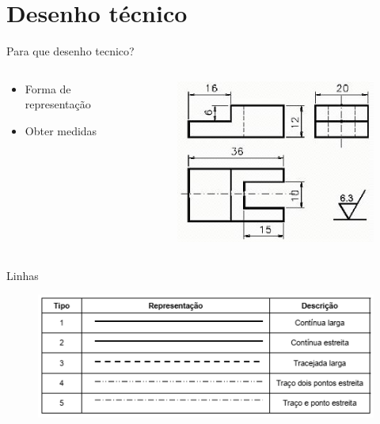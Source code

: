 \documentclass{cubeamer}
\begin{document}
\section{Desenho técnico}

\begin{frame}{Para que desenho tecnico?}
    \begin{columns}
        \begin{column}{0.5\textwidth}
            \begin{itemize}
                \item Forma de representação
                \item Obter medidas
            \end{itemize}
        \end{column}

        \begin{column}{0.5\textwidth}
            \begin{figure}
                \centering
                \includegraphics[height = 0.6\textheight]{img/desenho1.jpg}
                \caption{\cite{listade:online}}
            \end{figure}
        \end{column}
    \end{columns}
\end{frame}

\begin{frame}{Linhas}
    \begin{center}
        \begin{figure}
            \centering
            \includegraphics[height = 0.6\textheight]{img/desenho.png}
            \caption{\cite{linha:online}}
        \end{figure}
    \end{center}
\end{frame}
\end{document}
